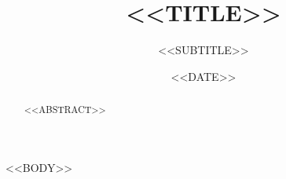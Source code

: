 \documentclass[11pt,a4paper]{article}
\title{<<TITLE>>}
\author{<<SUBTITLE>>}
\date{<<DATE>>}
\begin{document}
\maketitle
\thispagestyle{empty}

\begin{abstract}
<<ABSTRACT>>
\end{abstract}

\tableofcontents
\clearpage

<<BODY>>
\end{document}
